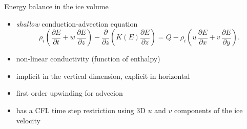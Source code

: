 \documentclass[hide notes,intlimits]{beamer}
\newcommand{\diff}[2]{\frac{\partial #1}{\partial #2}}
\begin{document}
\begin{frame}{Energy balance in the ice volume}
  \begin{itemize}
  \item \emph{shallow} conduction-advection equation
    \begin{equation}
      \label{eq:1}
  \rho_{i} \left( \diff{E}{t} + w\,\diff{E}{z} \right) - \diff{}{z}\left( K(E) \diff{E}{z} \right) = Q - \rho_{i} \left( u\,\diff{E}{x} + v\,\diff{E}{y} \right).
    \end{equation}
  \item non-linear conductivity (function of enthalpy)
  \item implicit in the vertical dimension, explicit in horizontal
  \item first order upwinding for advecion
  \item has a CFL time step restriction using 3D $u$ and $v$
    components of the ice velocity
  \end{itemize}
\end{frame}

\end{document}
